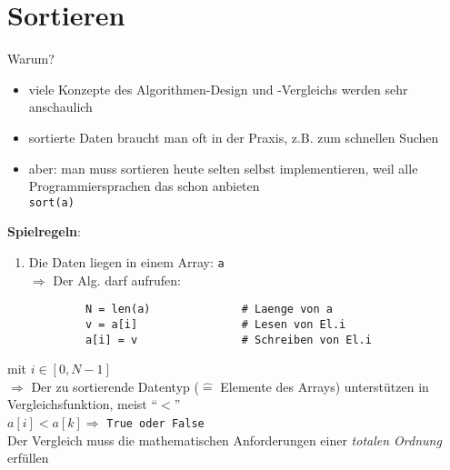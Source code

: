 
        \chapter{Sortieren}
        Warum?
        \begin{itemize}
            \item viele Konzepte des Algorithmen-Design und -Vergleichs werden sehr anschaulich
            \item sortierte Daten braucht man oft in der Praxis, z.B. zum schnellen Suchen
            \item aber: man muss sortieren heute selten selbst implementieren, weil alle Programmiersprachen das schon anbieten \\
            \hspace*{1cm} \verb|sort(a)|
        \end{itemize}

        \textbf{Spielregeln}:
        \begin{enumerate}
            \item Die Daten liegen in einem Array: \verb|a| \\
            $\Rightarrow$ Der Alg. darf aufrufen: \\
        \end{enumerate}
        \vspace*{-5mm}
        \begin{verbatim}
            N = len(a)              # Laenge von a
            v = a[i]                # Lesen von El.i
            a[i] = v                # Schreiben von El.i
        \end{verbatim}

        mit $i \in [0, N-1]$ \\
        $\Rightarrow$ Der zu sortierende Datentyp ($\widehat{=}$ Elemente des Arrays) unterstützen in Vergleichsfunktion, meist ``$<$'' \\
        $a[i] < a[k] \Rightarrow$ \verb|True oder False| \\

        Der Vergleich muss die mathematischen Anforderungen einer \emph{totalen Ordnung} erfüllen \\


